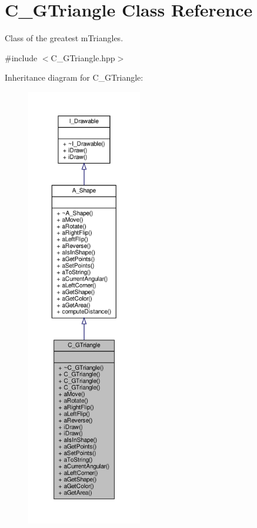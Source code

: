 \hypertarget{classC__GTriangle}{}\section{C\+\_\+\+G\+Triangle Class Reference}
\label{classC__GTriangle}


Class of the greatest m\+Triangles.  




{\ttfamily \#include $<$C\+\_\+\+G\+Triangle.\+hpp$>$}



Inheritance diagram for C\+\_\+\+G\+Triangle\+:
\nopagebreak
\begin{figure}[H]
\begin{center}
\leavevmode
\includegraphics[height=550pt]{classC__GTriangle__inherit__graph}
\end{center}
\end{figure}


